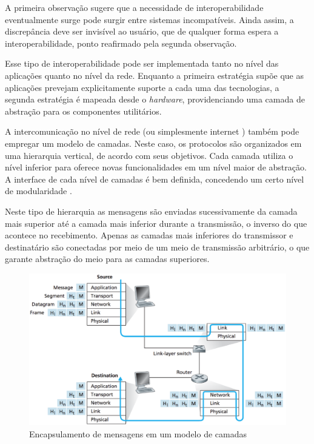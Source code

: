 A primeira observação sugere que a necessidade de interoperabilidade eventualmente
surge pode surgir entre sistemas incompatíveis. Ainda assim, a discrepância deve ser
invisível ao usuário, que de qualquer forma espera a interoperabilidade, ponto
reafirmado pela segunda observação.

Esse tipo de interoperabilidade pode ser implementada tanto no nível das aplicações
quanto no nível da rede. Enquanto a primeira estratégia supõe que as aplicações
prevejam explicitamente suporte a cada uma das tecnologias, a segunda estratégia
é mapeada desde o \textit{hardware}, providenciando uma camada de abstração para os
componentes utilitários.

A intercomunicação no nível de rede (ou simplesmente internet \cite{comer2000})
também pode empregar um modelo de camadas. Neste caso, os protocolos são organizados
em uma hierarquia vertical, de acordo com seus objetivos. Cada camada utiliza o
nível inferior para oferece novas funcionalidades em um nível maior de abstração. A
interface de cada nível de camadas é bem definida, concedendo um certo nível de
modularidade \cite{kurose2012}.

Neste tipo de hierarquia as mensagens são enviadas sucessivamente da camada mais
superior até a camada mais inferior durante a transmissão, o inverso do que acontece
no recebimento. Apenas as camadas mais inferiores do transmissor e destinatário são
conectadas por meio de um meio de transmissão arbitrário, o que garante abstração do
meio para as camadas superiores.

\begin{figure}[h]
	\centering
		\includegraphics[keepaspectratio=true,scale=0.6]{figuras/encapsulamento.eps}
	\caption{Encapsulamento de mensagens em um modelo de camadas \cite{kurose2012}}
	\label{fig:encapsulamento}
\end{figure}


